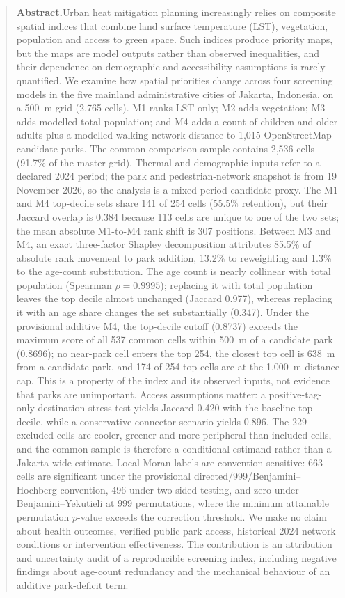 \documentclass[times,twoside]{_Templates/MultiTargetManuscript}
\begin{document}
\begin{abstract}
\noindent\textbf{Abstract.}\quad Urban heat mitigation planning increasingly relies on composite spatial
indices that combine land surface temperature (LST), vegetation, population and
access to green space. Such indices produce priority maps, but the maps are
model outputs rather than observed inequalities, and their dependence on
demographic and accessibility assumptions is rarely quantified. We examine how
spatial priorities change across four screening models in the five mainland
administrative cities of Jakarta, Indonesia, on a 500~m grid (2,765 cells).
M1 ranks LST only; M2 adds vegetation; M3 adds modelled total population; and
M4 adds a count of children and older adults plus a modelled walking-network
distance to 1,015 OpenStreetMap candidate parks. The common comparison sample
contains 2,536 cells (91.7\% of the master grid). Thermal and demographic inputs
refer to a declared 2024 period; the park and pedestrian-network snapshot is from
19 November 2026, so the analysis is a mixed-period candidate proxy. The M1 and M4 top-decile sets share 141 of 254 cells (55.5\% retention), but
their Jaccard overlap is 0.384 because 113 cells are unique to one of the two
sets; the mean absolute M1-to-M4 rank shift is 307 positions. Between M3 and M4, an
exact three-factor Shapley decomposition attributes 85.5\% of absolute rank
movement to park addition, 13.2\% to reweighting and 1.3\% to the age-count
substitution. The age count is nearly collinear with total population
(Spearman $\rho=0.9995$); replacing it with total population leaves the top
decile almost unchanged (Jaccard 0.977), whereas replacing it with an age share
changes the set substantially (0.347). Under the provisional additive M4, the
top-decile cutoff (0.8737) exceeds the maximum score of all 537 common cells
within 500~m of a candidate park (0.8696); no near-park cell enters the top 254,
the closest top cell is 638~m from a candidate park, and 174 of 254 top cells are
at the 1,000~m distance cap. This is a property of the index and its observed
inputs, not evidence that parks are unimportant. Access assumptions matter:
a positive-tag-only destination stress test yields Jaccard 0.420 with the
baseline top decile, while a conservative connector scenario yields 0.896.
The 229 excluded cells are cooler, greener and more peripheral than included
cells, and the common sample is therefore a conditional estimand rather than a
Jakarta-wide estimate. Local Moran labels are convention-sensitive: 663 cells
are significant under the provisional directed/999/Benjamini--Hochberg
convention, 496 under two-sided testing, and zero under Benjamini--Yekutieli at
999 permutations, where the minimum attainable permutation $p$-value exceeds the
correction threshold. We make no claim about health outcomes, verified public
park access, historical 2024 network conditions or intervention effectiveness.
The contribution is an attribution and uncertainty audit of a reproducible
screening index, including negative findings about age-count redundancy and the
mechanical behaviour of an additive park-deficit term.
\end{abstract}
\end{document}
